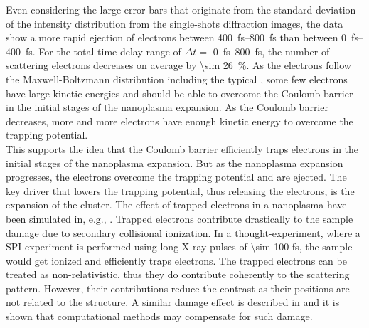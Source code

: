 Even considering the large error bars that originate from the standard deviation of the intensity distribution from the single-shots diffraction images, the data show a more rapid ejection of electrons between \SIrange{400}{800}{\femto\second} than between \SIrange{0}{400}{\femto\second}. For the total time delay range of $\Delta t=$ \SIrange{0}{800}{\femto\second}, the number of scattering electrons decreases on average by \SI{\sim 26}{\percent}. As the electrons follow the Maxwell-Boltzmann distribution including the typical , some few electrons have large kinetic energies and should be able to overcome the Coulomb barrier in the initial stages of the nanoplasma expansion. As the Coulomb barrier decreases, more and more electrons have enough kinetic energy to overcome the trapping potential.
\\[1\baselineskip]
%
This supports the idea that the Coulomb barrier efficiently traps electrons in the initial stages of the nanoplasma expansion. But as the nanoplasma expansion progresses, the electrons overcome the trapping potential and are ejected. The key driver that lowers the trapping potential, thus releasing the electrons, is the expansion of the cluster. The effect of trapped electrons in a nanoplasma have been simulated in, e.g., \citep{Hau-Riege-2004-PRE}. Trapped electrons contribute drastically to the sample damage due to secondary collisional ionization.
%
In a thought-experiment, where a SPI experiment is performed using long X-ray pulses of \num{\sim 100} fs, the sample would get ionized and efficiently traps electrons. The trapped electrons can be treated as non-relativistic, thus they do contribute coherently to the scattering pattern. However, their contributions reduce the contrast as their positions are not related to the structure. A similar damage effect is described in \citep{Quiney-2010-NatPhys} and it is shown that computational methods may compensate for such damage.\\[1\baselineskip]
%
%
%
